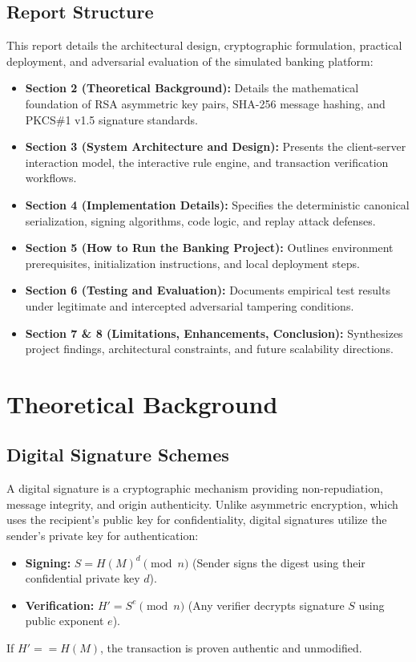 \documentclass[11pt,a4paper]{article}
\begin{document}
\subsection{Report Structure}
This report details the architectural design, cryptographic formulation, practical deployment, and adversarial evaluation of the simulated banking platform:
\begin{itemize}
    \item \textbf{Section 2 (Theoretical Background):} Details the mathematical foundation of RSA asymmetric key pairs, SHA-256 message hashing, and PKCS\#1 v1.5 signature standards.
    \item \textbf{Section 3 (System Architecture and Design):} Presents the client-server interaction model, the interactive rule engine, and transaction verification workflows.
    \item \textbf{Section 4 (Implementation Details):} Specifies the deterministic canonical serialization, signing algorithms, code logic, and replay attack defenses.
    \item \textbf{Section 5 (How to Run the Banking Project):} Outlines environment prerequisites, initialization instructions, and local deployment steps.
    \item \textbf{Section 6 (Testing and Evaluation):} Documents empirical test results under legitimate and intercepted adversarial tampering conditions.
    \item \textbf{Section 7 \& 8 (Limitations, Enhancements, Conclusion):} Synthesizes project findings, architectural constraints, and future scalability directions.
\end{itemize}

\section{Theoretical Background}

\subsection{Digital Signature Schemes}
A digital signature is a cryptographic mechanism providing non-repudiation, message integrity, and origin authenticity. Unlike asymmetric encryption, which uses the recipient's public key for confidentiality, digital signatures utilize the sender's private key for authentication:
\begin{itemize}
    \item \textbf{Signing:} $S = H(M)^d \pmod n$ (Sender signs the digest using their confidential private key $d$).
    \item \textbf{Verification:} $H' = S^e \pmod n$ (Any verifier decrypts signature $S$ using public exponent $e$).
\end{itemize}
If $H' == H(M)$, the transaction is proven authentic and unmodified.
\end{document}
